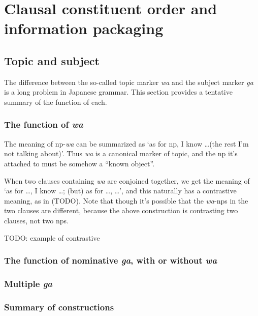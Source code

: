 \documentclass[UTF8, a4paper, oneside, scheme=plain]{ctexrep}
\newcommand{\corpus}[1]{\emph{#1}}
\newcommand{\translate}[1]{`#1'}
\begin{document}
\chapter{Clausal constituent order and information packaging}

\section{Topic and subject}\label{sec:topic-subject}

The difference between the so-called topic marker \corpus{wa} and the subject marker \corpus{ga}
is a long problem in Japanese grammar.
This section provides a tentative summary of the function of each.

\subsection{The function of \corpus{wa}}\label{sec:wa-topic}

The meaning of \ac{np}-\corpus{wa} can be summarized as 
\translate{as for \ac{np}, I know \dots (the rest I'm not talking about)}.
Thus \corpus{wa} is a canonical marker of topic,
and the \ac{np} it's attached to must be somehow a ``known object''.

When two clauses containing \corpus{wa} are conjoined together,
we get the meaning of 
\translate{as for \dots, I know \dots; (but) as for \dots, \dots},
and this naturally has a contrastive meaning, as in (TODO).
Note that though it's possible that the \corpus{wa}-\ac{np}s in the two clauses are different,
because the above construction is contrasting two clauses, not two \ac{np}s.

\begin{exe}
    \ex TODO: example of contrastive  
\end{exe}

\subsection{The function of nominative \corpus{ga}, with or without \corpus{wa}} 

\subsection{Multiple \corpus{ga}}\label{sec:multiple-ga}

\subsection{Summary of constructions}\label{sec:wa-ga-template}
\end{document}
